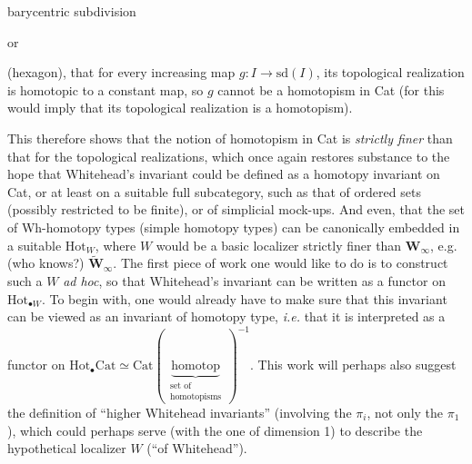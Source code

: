 barycentric subdivision

\begin{center}
\qquad\qquad\qquad or \qquad\qquad\qquad
{}
\end{center}

(hexagon), that for every increasing map $g : I \longrightarrow \mathrm{sd}(I)$, its topological realization is homotopic to a constant map, so $g$ cannot be a homotopism in Cat (for this would imply that its topological realization is a homotopism).

This therefore shows that the notion of homotopism in Cat is \textit{strictly finer} than that for the topological realizations, which once again restores substance to the hope that Whitehead's invariant could be defined as a homotopy invariant on Cat, or at least on a suitable full subcategory, such as that of ordered sets (possibly restricted to be finite), or of simplicial mock-ups. And even, that the set of Wh-homotopy types (simple homotopy types) can be
canonically embedded in a suitable $\mathrm{Hot}_W$, where $W$ would be a basic localizer strictly finer than $\mathbf{W}_\infty$, e.g. (who knows?) $\tilde{\mathbf{W}}_\infty$. The first piece of work one would like to do is to construct such a $W$ \textit{ad hoc}, so that Whitehead's invariant can be written as a functor on $\mathrm{Hot}_{\bullet W}$. To begin with, one would already have to make sure that this invariant can be viewed as an invariant of homotopy type, \textit{i.e.} that it is interpreted as a functor on $\mathrm{Hot}_{\bullet}\mathrm{Cat} \simeq \mathrm{Cat}(\,\underbrace{\text{homotop}}_{\substack{\text{set of}\\ \text{homotopisms}}}\,)^{-1}$. This work will perhaps also suggest the definition of ``higher Whitehead invariants'' (involving the $\pi_i$, not only the $\pi_1$), which could perhaps serve (with the one of dimension 1) to describe the hypothetical localizer $W$ (``of Whitehead'').

